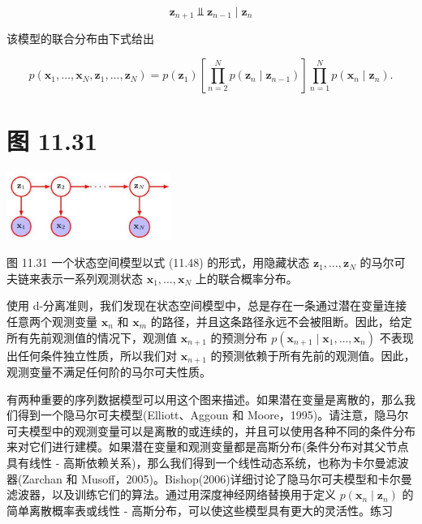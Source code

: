 \documentclass[10pt]{article}
\begin{document}
\[
{\mathbf{z}}_{n + 1} ⫫ {\mathbf{z}}_{n - 1} \mid  {\mathbf{z}}_{n} \tag{11.47}
\]

该模型的联合分布由下式给出

\[
p\left( {{\mathbf{x}}_{1},\ldots ,{\mathbf{x}}_{N},{\mathbf{z}}_{1},\ldots ,{\mathbf{z}}_{N}}\right)  = p\left( {\mathbf{z}}_{1}\right) \left\lbrack  {\mathop{\prod }\limits_{{n = 2}}^{N}p\left( {{\mathbf{z}}_{n} \mid  {\mathbf{z}}_{n - 1}}\right) }\right\rbrack  \mathop{\prod }\limits_{{n = 1}}^{N}p\left( {{\mathbf{x}}_{n} \mid  {\mathbf{z}}_{n}}\right) . \tag{11.48}
\]

\section*{图 11.31}

\begin{center}
\includegraphics[max width=0.4\textwidth]{images/0194e279-9b28-703a-88f4-c3ac21e2010d_371_1013_1742_536_222_0.jpg}
\end{center}
\hspace*{3em} 

图 11.31 一个状态空间模型以式 (11.48) 的形式，用隐藏状态 \({\mathbf{z}}_{1},\ldots ,{\mathbf{z}}_{N}\) 的马尔可夫链来表示一系列观测状态 \({\mathbf{x}}_{1},\ldots ,{\mathbf{x}}_{N}\) 上的联合概率分布。

使用 d-分离准则，我们发现在状态空间模型中，总是存在一条通过潜在变量连接任意两个观测变量 \({\mathbf{x}}_{n}\) 和 \({\mathbf{x}}_{m}\) 的路径，并且这条路径永远不会被阻断。因此，给定所有先前观测值的情况下，观测值 \({\mathbf{x}}_{n + 1}\) 的预测分布 \(p\left( {{\mathbf{x}}_{n + 1} \mid  {\mathbf{x}}_{1},\ldots ,{\mathbf{x}}_{n}}\right)\) 不表现出任何条件独立性质，所以我们对 \({\mathbf{x}}_{n + 1}\) 的预测依赖于所有先前的观测值。因此，观测变量不满足任何阶的马尔可夫性质。

有两种重要的序列数据模型可以用这个图来描述。如果潜在变量是离散的，那么我们得到一个隐马尔可夫模型(Elliott、Aggoun 和 Moore，1995)。请注意，隐马尔可夫模型中的观测变量可以是离散的或连续的，并且可以使用各种不同的条件分布来对它们进行建模。如果潜在变量和观测变量都是高斯分布(条件分布对其父节点具有线性 - 高斯依赖关系)，那么我们得到一个线性动态系统，也称为卡尔曼滤波器(Zarchan 和 Musoff，2005)。Bishop(2006)详细讨论了隐马尔可夫模型和卡尔曼滤波器，以及训练它们的算法。通过用深度神经网络替换用于定义 \(p\left( {{\mathbf{x}}_{n} \mid  {\mathbf{z}}_{n}}\right)\) 的简单离散概率表或线性 - 高斯分布，可以使这些模型具有更大的灵活性。练习
\end{document}
